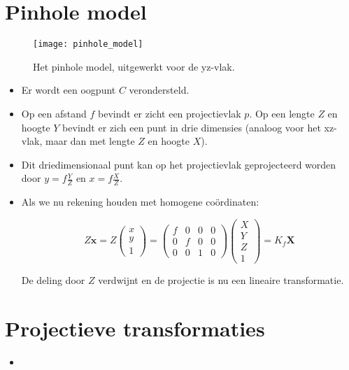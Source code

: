 \section{Pinhole model}
\begin{figure}[h]
	\texttt{[image: pinhole\_model]}
	\caption{Het pinhole model, uitgewerkt voor de yz-vlak.}
	\label{fig:pinhole_model}
\end{figure}
\begin{itemize}
	\item Er wordt een oogpunt $C$ verondersteld.
	\item Op een afstand $f$ bevindt er zicht een projectievlak $p$. 
	Op een lengte $Z$ en hoogte $Y$ bevindt er zich een punt in drie dimensies (analoog voor het xz-vlak, maar dan met lengte $Z$ en hoogte $X$).
	\item Dit driedimensionaal punt kan op het projectievlak geprojecteerd worden door $y = f\frac{Y}{Z}$ en $x = f\frac{X}{Z}$.
	\item Als we nu rekening houden met homogene coördinaten:
	
	$$Z\textbf{x} = Z\begin{pmatrix}
	x \\ y \\ 1
	\end{pmatrix}
	=
	\begin{pmatrix}
	f & 0 & 0 & 0 \\
	0 & f & 0 & 0 \\
	0 & 0 & 1 & 0
	\end{pmatrix}
	\begin{pmatrix}
	X \\ Y \\ Z \\ 1
	\end{pmatrix}
	=
	K_f\textbf{X}$$
	
	De deling door $Z$ verdwijnt en de projectie is nu een lineaire transformatie.
\end{itemize}

\section{Projectieve transformaties}
\begin{itemize}
	\item 
\end{itemize}

